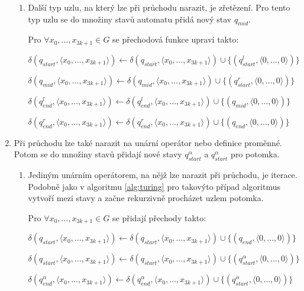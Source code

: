 \documentclass[thesis=B,czech]{FITthesis}[2019/12/23]
\theoremstyle{definition}
\begin{document}
\begin{enumerate}
\begin{enumerate}
	 \item \label{itm:concat2}{Další typ uzlu, na který lze při průchodu narazit, je zřetězení. Pro tento typ uzlu se do množiny stavů automatu přidá nový stav $q_{mid}$. 
	
	Pro $\forall x_0, \dots, x_{3k+1} \in G$ se přechodová funkce upraví takto:

		$\delta(q_{start}, \langle  x_0, \dots, x_{3k+1}\rangle)\leftarrow\delta(q_{start}, \langle  x_0, \dots, x_{3k+1}\rangle)\cup\{(q_{start}^{l}, \langle 0, \dots, 0\rangle)\}$

		$\delta(q_{mid}, \langle  x_0, \dots, x_{3k+1}\rangle)\leftarrow\delta(q_{mid}, \langle  x_0, \dots, x_{3k+1}\rangle)\cup\{(q_{start}^{r}, \langle 0, \dots, 0\rangle)\}$

		$\delta(q_{end}^{l}, \langle  x_0, \dots, x_{3k+1}\rangle)\leftarrow\delta(q_{end}^{l}, \langle  x_0, \dots, x_{3k+1}\rangle)\cup\{(q_{mid}, \langle 0, \dots,  0\rangle)\} $

		$\delta(q_{end}^{r}, \langle  x_0, \dots, x_{3k+1}\rangle)\leftarrow\delta(q_{end}^{r}, \langle  x_0, \dots, x_{3k+1}\rangle)\cup\{(q_{end}, \langle 0, \dots, 0\rangle)\} $
	}

   \end{enumerate}
    \item{Při průchodu lze také narazit na unární operátor nebo definice proměnné. Potom se do množiny stavů přidají nové stavy $q_{start}^{\alpha}$ a  $q_{start}^{\alpha}$ pro potomka.}
	\begin{enumerate}
	 \item \label{itm:iter2}{Jediným unárním operátorem, na nějž lze narazit při průchodu, je iterace. Podobně jako v algoritmu \ref{alg:turing} pro takovýto případ algoritmus vytvoří  mezi stavy a začne rekurzivně procházet uzlem potomka.
	
	Pro $\forall x_0, \dots, x_{3k+1} \in G$ se přidají přechody takto:

		$\delta(q_{start}, \langle  x_0, \dots, x_{3k+1}\rangle)\leftarrow\delta(q_{start}, \langle  x_0, \dots, x_{3k+1}\rangle)\cup\{(q_{end}, \langle 0, \dots, 0\rangle)\}$

		$\delta(q_{start}, \langle  x_0, \dots, x_{3k+1}\rangle)\leftarrow\delta(q_{start}, \langle  x_0, \dots, x_{3k+1}\rangle)\cup\{(q_{start}^{\alpha}, \langle 0, \dots, 0\rangle)\}$

		$\delta(q_{end}^{\alpha}, \langle  x_0, \dots, x_{3k+1}\rangle)\leftarrow\delta(q_{end}^{\alpha}, \langle  x_0, \dots, x_{3k+1}\rangle)\cup\{(q_{start}^{\alpha}, \langle 0, \dots, 0\rangle)\} $

}
\end{enumerate}
\end{enumerate}
\end{document}
